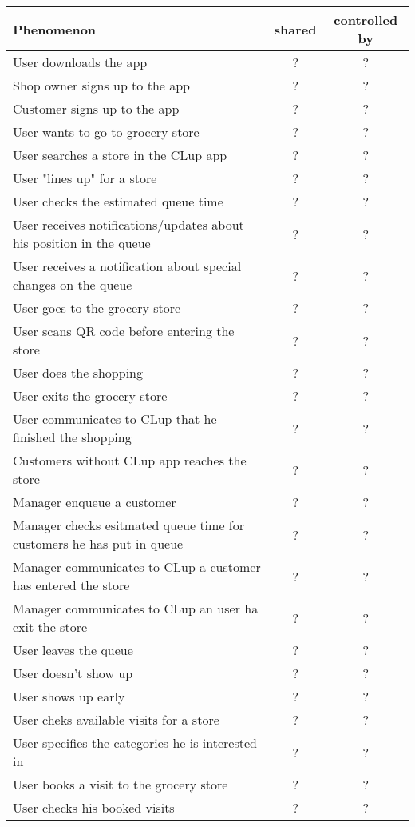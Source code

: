 \begin{tabular}{|l|c|c|}
    \hline
    \textbf{Phenomenon} & \textbf{shared} & \textbf{controlled by}\\
    \hline
    User downloads the app & ? & ? \\
    Shop owner signs up to the app & ? & ? \\
    Customer signs up to the app & ? & ? \\
    \hline
    User wants to go to grocery store & ? & ? \\
    User searches a store in the CLup app & ? & ? \\
    User "lines up" for a store & ? & ? \\
    User checks the estimated queue time & ? & ? \\
    User receives notifications/updates about his position in the queue & ? & ? \\
    User receives a notification about special changes on the queue & ? & ? \\
    User goes to the grocery store & ? & ? \\
    User scans QR code before entering the store & ? & ? \\
    User does the shopping & ? & ? \\
    User exits the grocery store & ? & ? \\
    User communicates to CLup that he finished the shopping & ? & ? \\
    Customers without CLup app reaches the store & ? & ? \\
    Manager enqueue a customer & ? & ? \\
    Manager checks esitmated queue time for customers he has put in queue & ? & ? \\
    Manager communicates to CLup a customer has entered the store & ? & ? \\
    Manager communicates to CLup an user ha exit the store & ? & ? \\
    User leaves the queue & ? & ? \\
    User doesn't show up & ? & ? \\
    User shows up early & ? & ? \\
    \hline
    User cheks available visits for a store & ? & ? \\
    User specifies the categories he is interested in & ? & ? \\
    User books a visit to the grocery store & ? & ? \\
    User checks his booked visits & ? & ? \\

\end{tabular}
